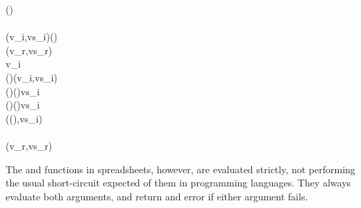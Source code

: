 \begin{hscode}\SaveRestoreHook
{}%
%
%
%
%
%
\>[B]{}\;\;\;(\;)\mathrel{=}{}\<[E]%
\\
\>[B]{}\<[4]%
\>[4]{}\<[E]%
\\
\>[4]{}\<[7]%
\>[7]{}(v_i,vs_{i})\mathrel{=}\mathbin{\$}(\;)\;\;\;\<[E]%
\\
\>[4]{}\<[7]%
\>[7]{}(v_r,vs_r)\mathrel{=}{}\<[E]%
\\
\>[7]{}\<[10]%
\>[10]{}\;v_i\;\<[E]%
\\
\>[7]{}\<[10]%
\>[10]{}(\;\anonymous ){}\<[26]%
\>[26]{}\to (v_i,vs_{i}){}\<[E]%
\\
\>[7]{}\<[10]%
\>[10]{}(\;){}\<[26]%
\>[26]{}\to (\;)\;\;vs_{i}\;\<[E]%
\\
\>[7]{}\<[10]%
\>[10]{}(\;){}\<[26]%
\>[26]{}\to (\;)\;\;vs_{i}\;\<[E]%
\\
\>[7]{}\<[10]%
\>[10]{}\anonymous {}\<[26]%
\>[26]{}\to ((\;),vs_{i}){}\<[E]%
\\
\>[B]{}\<[4]%
\>[4]{}\<[E]%
\\
\>[4]{}\<[7]%
\>[7]{}(v_r,vs_r){}\<[E]%
\ColumnHook
\end{hscode}\resethooks

The  and  functions in spreadsheets, however, are evaluated strictly,
not performing the usual short-circuit expected of them in programming
languages. They always evaluate both arguments, and return and error if either
argument fails.

